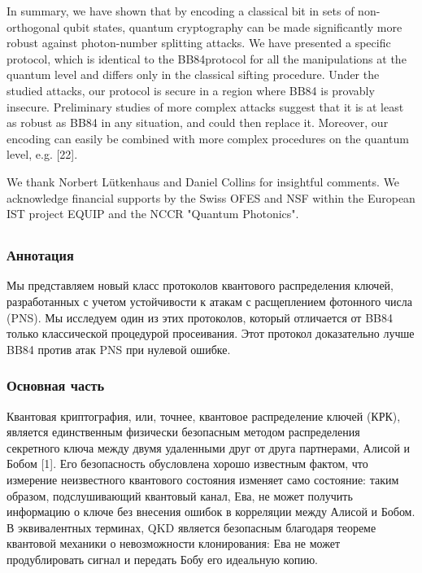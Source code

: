 In summary, we have shown that by encoding a classical bit in sets of non-orthogonal qubit states, quantum cryptography can be made significantly more robust against photon-number splitting attacks. We have presented a specific protocol, which is identical to the BB84protocol for all the manipulations at the quantum level and differs only in the classical sifting procedure. Under the studied attacks, our protocol is secure in a region where BB84 is provably insecure. Preliminary studies of more complex attacks suggest that it is at least as robust as BB84 in any situation, and could then replace it. Moreover, our encoding can easily be combined with more complex procedures on the quantum level, e.g. [22].

We thank Norbert Lütkenhaus and Daniel Collins for insightful comments. We acknowledge financial supports by the Swiss OFES and NSF within the European IST project EQUIP and the NCCR "Quantum Photonics".


\subsection{\trnas}
\subsubsection*{Аннотация}

Мы представляем новый класс протоколов квантового распределения ключей, разработанных с учетом устойчивости к атакам с расщеплением фотонного числа (PNS). Мы исследуем один из этих протоколов, который отличается от BB84 только классической процедурой просеивания. Этот протокол доказательно лучше BB84 против атак PNS при нулевой ошибке.


\subsubsection*{Основная часть}
Квантовая криптография, или, точнее, квантовое распределение ключей (КРК), является единственным физически безопасным методом распределения секретного ключа между двумя удаленными друг от друга партнерами, Алисой и Бобом [1]. Его безопасность обусловлена хорошо известным фактом, что измерение неизвестного квантового состояния изменяет само состояние: таким образом, подслушивающий квантовый канал, Ева, не может получить информацию о ключе без внесения ошибок в корреляции между Алисой и Бобом. В эквивалентных терминах, QKD является безопасным благодаря теореме квантовой механики о невозможности клонирования: Ева не может продублировать сигнал и передать Бобу его идеальную копию.

